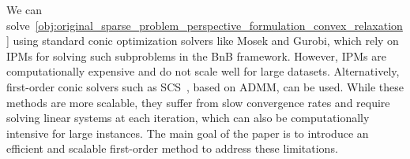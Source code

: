 We can solve~\eqref{obj:original_sparse_problem_perspective_formulation_convex_relaxation} using standard conic optimization solvers like Mosek and Gurobi, which rely on IPMs for solving such subproblems in the BnB framework.
However, IPMs are computationally expensive and do not scale well for large datasets.
Alternatively, first-order conic solvers such as SCS~\cite{o2016conic}, based on ADMM, can be used.
While these methods are more scalable, they suffer from slow convergence rates and require solving linear systems at each iteration, which can also be computationally intensive for large instances. The main goal of the paper is to introduce an efficient and scalable first-order method to address these limitations.